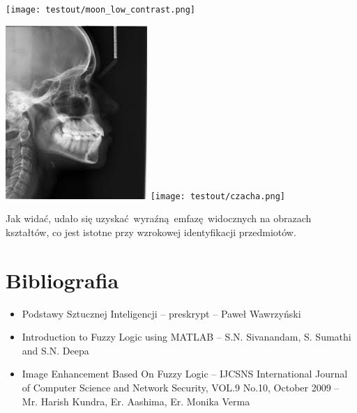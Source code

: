 \documentclass[a4paper,12pt]{article}
\begin{document}
\texttt{[image: testout/moon\_low\_contrast.png]}

\includegraphics{testin/czacha.png}
\texttt{[image: testout/czacha.png]}

Jak widać, udało się uzyskać wyraźną emfazę widocznych na obrazach kształtów,
co jest istotne przy wzrokowej identyfikacji przedmiotów.

\section{Bibliografia}
\begin{itemize}
	\item Podstawy Sztucznej Inteligencji -- preskrypt -- Paweł Wawrzyński
	\item Introduction to Fuzzy Logic using MATLAB -- S.N. Sivanandam, S.
		Sumathi and S.N. Deepa
	\item Image Enhancement Based On Fuzzy Logic -- IJCSNS International Journal
		of Computer Science and Network Security, VOL.9 No.10, October 2009 --
		Mr. Harish Kundra, Er. Aashima, Er. Monika Verma
\end{itemize}
\end{document}
